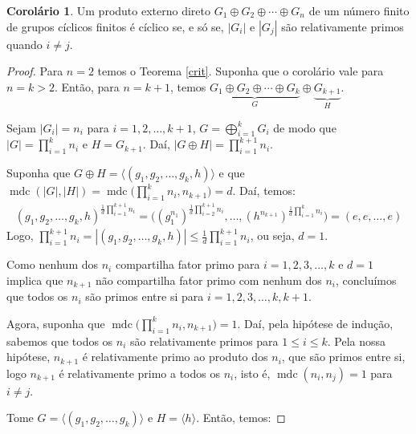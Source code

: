 \documentclass[a4paper,portuguese,11pt,twoside, leqno]{book}
\DeclareMathOperator{\mdc}{mdc}
\theoremstyle{definition}
\newtheorem{corollary}{Corolário}[theorem]
\begin{document}
	\begin{corollary}
		\label{C1}
		Um produto externo direto $G_1\oplus G_2\oplus\cdots\oplus G_n$ de um número finito de grupos cíclicos finitos é cíclico se, e só se, $|G_i|$ e $|G_j|$ são relativamente primos quando $i\neq j$.
	\end{corollary}
	
	\begin{proof}
		Para $n = 2$ temos o Teorema \eqref{crit}. Suponha que o corolário vale para $n = k>2$. Então, para $n = k+1$, temos $\underbrace{G_1\oplus G_2\oplus\cdots\oplus G_k }_{G}\oplus\underbrace{ G_{k+1}}_{H}$. 
		\par\vspace{0.3cm} Sejam $|G_i| = n_i$ para $i = 1, 2, \dots , k + 1$, $\displaystyle{G = \bigoplus_{i=1}^{k}G_i}$ de modo que $\displaystyle{|G| = \prod_{i =1}^{k}n_i}$ e $H = G_{k+1}$. Daí, $\displaystyle{|G\oplus H| = \prod_{i = 1}^{k+1}n_i}$. 
		\par\vspace{0.3cm} Suponha que $G\oplus H = \langle (g_1, g_2, \dots , g_k, h) \rangle$ e que $\displaystyle{\mdc(|G|, |H|)= \mdc\Bigg(\prod_{i = 1}^{k}n_i, n_{k+1}\Bigg) = d}$. Daí, temos:
		\begin{align*}
		(g_1, g_2, \dots, g_k, h)^{\displaystyle{\frac{1}{d}\prod_{i=1}^{k+1}n_i}} = \Bigg((g_1^{n_1})^{\displaystyle{\frac{1}{d}\prod_{i=2}^{k+1}n_i}}  ,\dots, (h^{n_{k+1}})^{\displaystyle{\frac{1}{d}\prod_{i = 1}^{k}n_i}} \Bigg) = (e, e, \dots, e)
		\end{align*}
		Logo, $\displaystyle{ \prod_{i=1}^{k+1}n_i = |(g_1, g_2,\dots, g_k, h)| \leq \frac{1}{d}\prod_{i=1}^{k+1}n_i }$, ou seja, $d = 1$.
		\par\vspace{0.3cm} Como nenhum dos $n_i$ compartilha fator primo para $i = 1, 2, 3, \dots, k$ e $d = 1$ implica que $n_{k+1}$ não compartilha fator primo com nenhum dos $n_i$, concluímos que todos os $n_i$ são primos entre si para $i = 1, 2, 3, \dots, k, k+1$.
		\par\vspace{0.3cm} Agora, suponha que $\displaystyle{\mdc\Bigg(\prod_{i=1}^{k}n_i , n_{k+1}\Bigg)} = 1$. Daí, pela hipótese de indução, sabemos que todos os $n_i$ são relativamente primos para $1\leq i\leq k$. Pela nossa hipótese, $n_{k+1}$ é relativamente primo ao produto dos $n_i$, que são primos entre si, logo $n_{k+1}$ é relativamente primo a todos os $n_i$, isto é, 
		$\mdc(n_i, n_j) = 1$ para $i\neq j$. 
		\par\vspace{0.3cm} Tome $G = \langle (g_1, g_2, \dots, g_k) \rangle$ e $H = \langle h \rangle$. Então, temos:

\end{proof}
\end{document}

